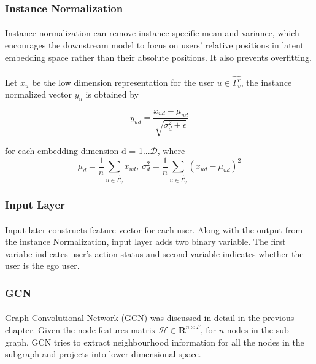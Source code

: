 \subsubsection{Instance Normalization}

\paragraph{} Instance normalization can remove instance-specific mean and variance, which encourages the downstream model 
to focus on users’ relative positions in latent embedding space rather than their absolute positions. It also prevents 
overfitting.

\paragraph{} Let $x_u$ be the low dimension representation for the user $u \in \hat{\Gamma_v^r}$, the instance normalized
vector $y_u$ is obtained by

\begin{equation}
    y_{ud} = \frac{x_{ud}-\mu_{ud}}{\sqrt{\sigma_d^2+\epsilon}}
\end{equation}

for each embedding dimension d = 1...$\mathcal{D}$, where 
\begin{equation}
    \mu_d = \frac{1}{n}\sum_{u \in \hat{\Gamma_v^r}}x_{ud},\ \sigma_d^2 = \frac{1}{n}\sum_{u \in \hat{\Gamma_v^r}}(x_{ud}-\mu_{ud})^2
\end{equation}


\subsubsection{Input Layer}

\paragraph{} Input later constructs feature vector for each user. Along with the output from the instance Normalization,
input layer adds two binary variable. The first variabe indicates user's action status and second variable indicates whether
the user is the ego user.

\subsubsection{GCN}

\paragraph{} Graph Convolutional Network (GCN) was discussed in detail in the previous chapter. Given the node features 
matrix $\mathcal{H} \in \mathbf{R}^{n \times F}$, for $n$ nodes in the sub-graph, GCN tries to extract neighbourhood 
information for all the nodes in the subgraph and projects into lower dimensional space.

